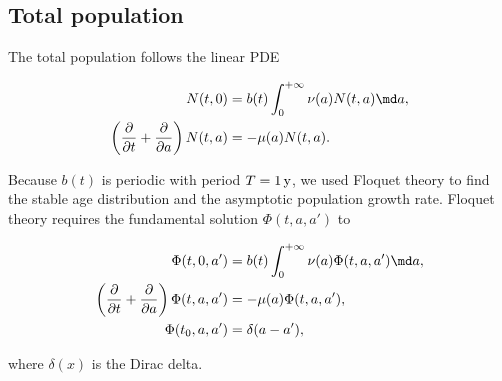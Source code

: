 \documentclass{jpmarticle}
\let\subequationsorig\subequations%
\let\endsubequationsorig\endsubequations%
\renewenvironment{subequations}{
  \subequationsorig
  \renewcommand{\theequation}{\theparentequation.\arabic{equation}}
}{
  \endsubequationsorig
}
\begin{document}
\subsection{Total population}

The total population follows the linear PDE
\begin{subequations}
  \label{model_age_structured_total}
  \begin{align}
    N(t, 0)
    &= b(t) \int_0^{+\infty} \nu(a) N(t, a) \md a,
    \\
    \left(\frac{\partial}{\partial t}
      + \frac{\partial}{\partial a}\right)
    N(t, a)
    &= - \mu(a) N(t, a).
  \end{align}
\end{subequations}

Because $b(t)$ is periodic with period $T = \unit[1]{y}$, we used
Floquet theory \autocite{parker_1992} to find the stable age
distribution and the asymptotic population growth rate. Floquet theory
requires the fundamental solution $\Phi(t, a, a')$ to
\begin{subequations}
  \begin{align}
    \Phi(t, 0, a')
    &= b(t) \int_0^{+\infty} \nu(a) \Phi(t, a, a') \md a,
    \\
    \left(\frac{\partial}{\partial t}
      + \frac{\partial}{\partial a}\right)
    \Phi(t, a, a')
    &= - \mu(a) \Phi(t, a, a'),
    \\
    \Phi(t_0, a, a')
    &= \delta(a - a'),
  \end{align}
\end{subequations}
where $\delta(x)$ is the Dirac delta.
\end{document}
